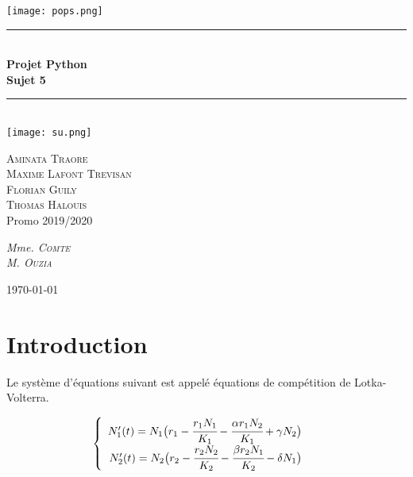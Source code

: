 \documentclass[11pt]{article}
\newcommand{\HRule}{\rule{\linewidth}{0.5mm}}
\begin{document}
\begin{titlepage}
    \begin{sffamily}
    \begin{center}
    \texttt{[image: pops.png]}~\\[1.5cm]
    \HRule \\[0.4cm]
    { \huge \bfseries Projet Python \\ Sujet 5
    \\[0.4cm] }
    \HRule \\[2cm]
    \texttt{[image: su.png]}
    \\[1.4cm]
    \begin{minipage}{0.4\textwidth}
    \begin{flushleft} \large
    \textsc{Aminata Traore}\\
    \textsc{Maxime Lafont Trevisan}\\
    \textsc{Florian Guily}\\
    \textsc{Thomas Halouis}  \\
    Promo 2019/2020\\
    \end{flushleft}
    \end{minipage}
    \begin{minipage}{0.4\textwidth}
    \begin{flushright} \large
    \emph{ Mme.  \textsc{Comte}} \\
    \emph{ M.  \textsc{Ouzia}}
    \end{flushright}
    \end{minipage}
    \vfill
    {\large \today}
    \end{center}
    \end{sffamily}
\end{titlepage}
\tableofcontents
\newpage
\section{Introduction}
Le système d'équations suivant est appelé équations de compétition de Lotka-Volterra. \begin{center}
\[
\left\{
\begin{array}{r c}
N_1'(t) = N_1 \big( r_1 - \cfrac{r_1N_1}{K_1} - \cfrac{\alpha r_1N_2}{K_1} + \gamma N_2\big) & \\
N_2'(t) = N_2 \big( r_2 - \cfrac{r_2N_2}{K_2} - \cfrac{\beta r_2N_1}{K_2} - \delta N_1\big) &
\end{array}
\right.
\]
\end{center}
\end{document}
